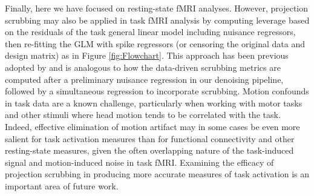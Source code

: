 \documentclass{article}
\begin{document}
Finally, here we have focused on resting-state fMRI analyses. However, projection scrubbing may also be applied in task fMRI analysis by computing leverage based on the residuals of the task general linear model including nuisance regressors, then re-fitting the GLM with spike regressors (or censoring the original data and design matrix) as in Figure \ref{fig:Flowchart}. This approach has been previous adopted by \cite{mejia2022longitudinal} and is analogous to how the data-driven scrubbing metrics are computed after a preliminary nuisance regression in our denoising pipeline, followed by a simultaneous regression to incorporate scrubbing. Motion confounds in task data are a known challenge, particularly when working with motor tasks and other stimuli where head motion tends to be correlated with the task. Indeed, effective elimination of motion artifact may in some cases be even more salient for task activation measures than for functional connectivity and other resting-state measures, given the often overlapping nature of the task-induced signal and motion-induced noise in task fMRI. Examining the efficacy of projection scrubbing in producing more accurate measures of task activation is an important area of future work.



\end{document}
